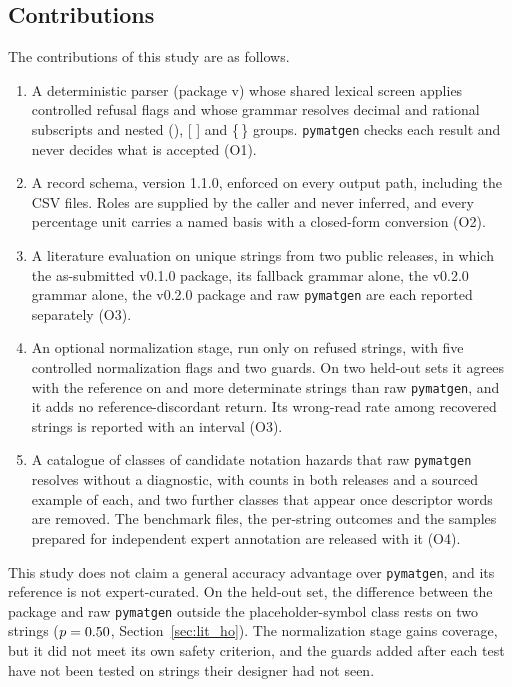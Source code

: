 \documentclass[10pt,journal]{IEEEtran}
\newcommand{\pmg}{\texttt{pymatgen}\xspace}
\begin{document}
\subsection{Contributions}
\label{sec:contributions}
The contributions of this study are as follows.
\begin{enumerate}
\item A deterministic parser (package v\ParserVersion) whose shared lexical screen applies \NFlags{} controlled refusal flags and whose grammar resolves decimal and rational subscripts and nested (), [ ] and \{\,\} groups. \pmg checks each result and never decides what is accepted (O1).
\item A record schema, version 1.1.0, enforced on every output path, including the CSV files. Roles are supplied by the caller and never inferred, and every percentage unit carries a named basis with a closed-form conversion (O2).
\item A literature evaluation on \NLitStrings{} unique strings from two public releases, in which the as-submitted v0.1.0 package, its fallback grammar alone, the v0.2.0 grammar alone, the v0.2.0 package and raw \pmg are each reported separately (O3).
\item An optional normalization stage, run only on refused strings, with five controlled normalization flags and two guards. On two held-out sets it agrees with the reference on \StOneGainPmg{} and \StTwoGainPmg{} more determinate strings than raw \pmg, and it adds no reference-discordant return. Its wrong-read rate among recovered strings is reported with an interval (O3).
\item A catalogue of \NHazClasses{} classes of candidate notation hazards that raw \pmg resolves without a diagnostic, with counts in both releases and a sourced example of each, and two further classes that appear once descriptor words are removed. The benchmark files, the per-string outcomes and the samples prepared for independent expert annotation are released with it (O4).
\end{enumerate}

This study does not claim a general accuracy advantage over \pmg, and its reference is not expert-curated. On the held-out set, the difference between the package and raw \pmg outside the placeholder-symbol class rests on two strings ($p=0.50$, Section~\ref{sec:lit_ho}). The normalization stage gains coverage, but it did not meet its own safety criterion, and the guards added after each test have not been tested on strings their designer had not seen.
\end{document}
